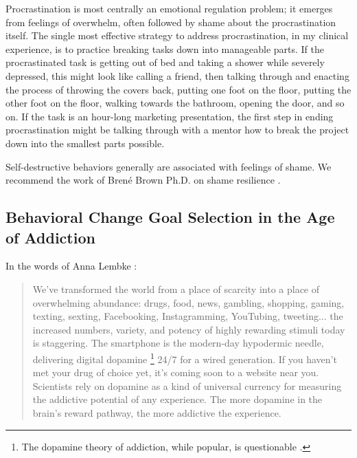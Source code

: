 \documentclass[12pt,letterpaper]{book}
\begin{document}
Procrastination is most centrally an emotional regulation problem; it emerges from feelings of overwhelm, often followed by shame about the procrastination itself. The single most effective strategy to address procrastination, in my clinical experience, is to practice breaking tasks down into manageable parts. If the procrastinated task is getting out of bed and taking a shower while severely depressed, this might look like calling a friend, then talking through and enacting the process of throwing the covers back, putting one foot on the floor, putting the other foot on the floor, walking towards the bathroom, opening the door, and so on. If the task is an hour-long marketing presentation, the first step in ending procrastination might be talking through with a mentor how to break the project down into the smallest parts possible.

Self-destructive behaviors generally are associated with feelings of shame. We recommend the work of Brené Brown Ph.D. on shame resilience \cite{brownThought}.

\subsection*{Behavioral Change Goal Selection in the Age of Addiction}
In the words of Anna Lembke \cite{lembke2021dopamine}:
\begin{quotation}
    We've transformed the world from a place of scarcity into a place of overwhelming abundance: drugs, food, news, gambling, shopping, gaming, texting, sexting, Facebooking, Instagramming, YouTubing, tweeting... the increased numbers, variety, and potency of highly rewarding stimuli today is staggering. The smartphone is the modern-day hypodermic needle, delivering digital dopamine \footnote{The dopamine theory of addiction, while popular, is questionable \cite{nutt2015dopamine}.} 24/7 for a wired generation. If you haven't met your drug of choice yet, it's coming soon to a website near you. Scientists rely on dopamine as a kind of universal currency for measuring the addictive potential of any experience. The more dopamine in the brain's reward pathway, the more addictive the experience.
\end{quotation}
\end{document}
